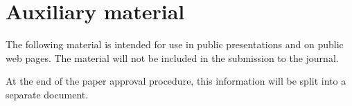 \documentclass[PAPER, american,coverpage,texlive=2016, english]{\ATLASLATEXPATH atlasdoc}
\begin{document}
\printbibliography
%
%


\clearpage
\appendix
\part*{Auxiliary material}

The following material is intended for use in public presentations and on public web pages.
The material will not be included in the submission to the journal.

At the end of the paper approval procedure, this information will be split into a separate document.

\end{document}
